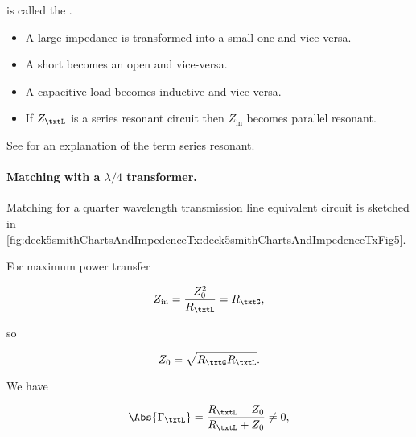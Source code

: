 is called the .

\begin{itemize}
\item A large impedance is transformed into a small one and vice-versa.
\item A short becomes an open and vice-versa.
\item A capacitive load becomes inductive and vice-versa.
\item If \( Z_\txtL \) is a series resonant circuit then \( Z_{\textrm{in}} \) becomes parallel resonant.
\end{itemize}

See \citep{seriesResonance} for an explanation of the term series resonant.

\paragraph{Matching with a \( \lambda/4 \) transformer.}

Matching for a quarter wavelength transmission line equivalent circuit is sketched in \cref{fig:deck5smithChartsAndImpedenceTx:deck5smithChartsAndImpedenceTxFig5}.


For maximum power transfer

\begin{equation}\label{eqn:uwavesDeck5SmithChartCore:300}
Z_{\textrm{in}} = \frac{Z_0^2}{R_\txtL} = R_\txtG,
\end{equation}

so

\begin{equation}\label{eqn:uwavesDeck5SmithChartCore:320}
Z_0 = \sqrt{ R_\txtG R_\txtL }.
\end{equation}

We have

\begin{equation}\label{eqn:uwavesDeck5SmithChartCore:340}
\Abs{\Gamma_\txtL} = \frac{ R_\txtL - Z_0 }{R_\txtL + Z_0} \ne 0,
\end{equation}

